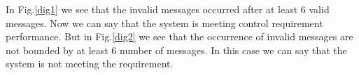 In Fig.\ref{dig1} we see that the invalid messages occurred after at least 6 valid messages. Now we can say that
the system is meeting control requirement performance. But in Fig.\ref{dig2} we see that the occurrence of 
invalid messages are not bounded by at least 6 number of messages. In this case we can say that
the system is not meeting the requirement.



